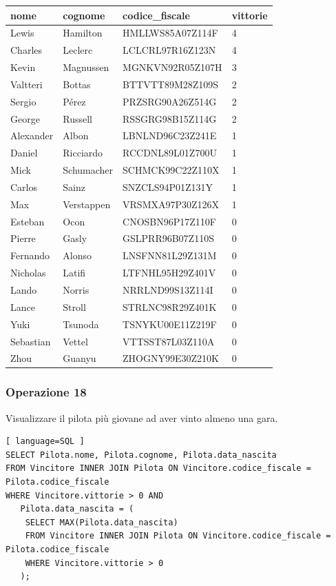 \documentclass[11pt]{article}
\begin{document}
\begin{table}[H]
    \centering
    \begin{tabular}{|l|l|l|l|}
    \hline
        \textbf{nome} & \textbf{cognome} & \textbf{codice\_fiscale} & \textbf{vittorie} \\ \hline
        Lewis & Hamilton & HMLLWS85A07Z114F & 4 \\ \hline
        Charles & Leclerc & LCLCRL97R16Z123N & 4 \\ \hline
        Kevin & Magnussen & MGNKVN92R05Z107H & 3 \\ \hline
        Valtteri & Bottas & BTTVTT89M28Z109S & 2 \\ \hline
        Sergio & Pérez & PRZSRG90A26Z514G & 2 \\ \hline
        George & Russell & RSSGRG98B15Z114G & 2 \\ \hline
        Alexander & Albon & LBNLND96C23Z241E & 1 \\ \hline
        Daniel & Ricciardo & RCCDNL89L01Z700U & 1 \\ \hline
        Mick & Schumacher & SCHMCK99C22Z110X & 1 \\ \hline
        Carlos & Sainz & SNZCLS94P01Z131Y & 1 \\ \hline
        Max & Verstappen & VRSMXA97P30Z126X & 1 \\ \hline
        Esteban & Ocon & CNOSBN96P17Z110F & 0 \\ \hline
        Pierre & Gasly & GSLPRR96B07Z110S & 0 \\ \hline
        Fernando & Alonso & LNSFNN81L29Z131M & 0 \\ \hline
        Nicholas & Latifi & LTFNHL95H29Z401V & 0 \\ \hline
        Lando & Norris & NRRLND99S13Z114I & 0 \\ \hline
        Lance & Stroll & STRLNC98R29Z401K & 0 \\ \hline
        Yuki & Tsunoda & TSNYKU00E11Z219F & 0 \\ \hline
        Sebastian & Vettel & VTTSST87L03Z110A & 0 \\ \hline
        Zhou & Guanyu & ZHOGNY99E30Z210K & 0 \\ \hline
    \end{tabular}
\end{table}


\subsubsection{Operazione 18}
Visualizzare il pilota più giovane ad aver vinto almeno una gara.
\begin{lstlisting}[ language=SQL ]
SELECT Pilota.nome, Pilota.cognome, Pilota.data_nascita
FROM Vincitore INNER JOIN Pilota ON Vincitore.codice_fiscale = Pilota.codice_fiscale
WHERE Vincitore.vittorie > 0 AND
   Pilota.data_nascita = (
    SELECT MAX(Pilota.data_nascita)
    FROM Vincitore INNER JOIN Pilota ON Vincitore.codice_fiscale = Pilota.codice_fiscale
    WHERE Vincitore.vittorie > 0
   );
\end{lstlisting}
\end{document}
